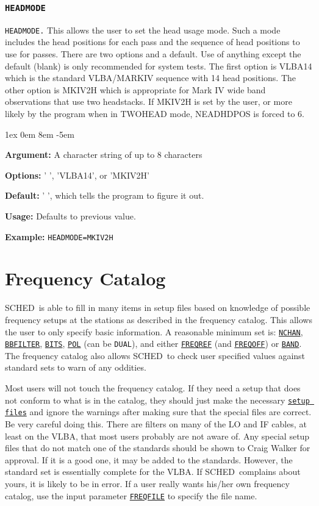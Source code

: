 \documentclass{report}
\newcommand{\schedb}{{\sc SCHED~}}
\newcommand{\rcwbox}[5]{
  \begin{list}{}{\parsep 1ex  \itemsep 0em
                 \leftmargin 8em  \itemindent -5em }
    \item {\bf Argument:} #1
    \item {\bf Options:}  #2
    \item {\bf Default:}  #3
    \item {\bf Usage:}    #4
    \item {\bf Example:}  #5
  \end{list}
}
\begin{document}
\subsubsection{\label{TP:HEADMODE}{\tt HEADMODE}}

{\tt HEADMODE.}  This allows the user to set the head usage mode.
Such a mode includes the head positions for each pass and the
sequence of head positions to use for passes.  There are two options
and a default.  Use of anything except the default (blank) is only recommended
for system tests.  The first option is VLBA14 which is the standard
VLBA/MARKIV sequence with 14 head positions.  The other option is
MKIV2H which is appropriate for Mark IV wide band observations that
use two headstacks.  If MKIV2H is set by the user, or more likely by
the program when in TWOHEAD mode, NEADHDPOS is forced to 6.

\rcwbox
{A character string of up to 8 characters}
{' ', 'VLBA14', or 'MKIV2H'}
{' ', which tells the program to figure it out.}
{Defaults to previous value.}
{{\tt HEADMODE=MKIV2H}}

\section{\label{SEC:FRQCAT}Frequency Catalog}

\schedb is able to fill in many items in setup files based on
knowledge of possible frequency setups at the stations as described in
the frequency catalog.  This allows the user to only specify basic
information.  A reasonable minimum set is: 
{\hyperref[SP:NCHAN]{{\tt NCHAN}}}, 
{\hyperref[SP:BBFILTER]{{\tt BBFILTER}}},
{\hyperref[SP:BITS]{{\tt BITS}}}, 
{\hyperref[SP:POL]{{\tt POL}}} (can be {\tt DUAL}), and either 
{\hyperref[SP:FREQREF]{{\tt FREQREF}}} (and
{\hyperref[SP:FREQOFF]{{\tt FREQOFF}}}) or 
{\hyperref[SP:BAND]{{\tt BAND}}}.
The frequency catalog also allows \schedb to check user specified
values against standard sets to warn of any oddities.

Most users will not touch the frequency catalog.  If they need a setup
that does not conform to what is in the catalog, they should just make
the necessary 
{\hyperref[SEC:SETUPS]{{\tt setup files}}} and ignore the
warnings after making sure that the special files are correct.  Be
very careful doing this.  There are filters on many of the LO and IF
cables, at least on the VLBA, that most users probably are not aware
of.  Any special setup files that do not match one of the standards
should be shown to Craig Walker for approval.  If it is a good one, it
may be added to the standards.  However, the standard set is
essentially complete for the VLBA.  If \schedb complains about yours,
it is likely to be in error.  If a user really wants his/her own
frequency catalog, use the input parameter
{\hyperref[MP:FREQFILE]{{\tt FREQFILE}}} to specify the file name.
\end{document}
